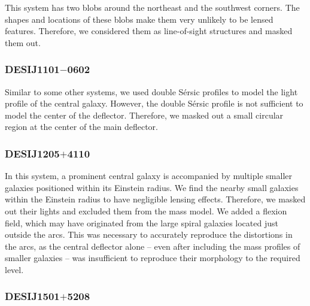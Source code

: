 \documentclass{aa}
\begin{document}
This system has two blobs around the northeast and the southwest corners. The shapes and locations of these blobs make them very unlikely to be lensed features. Therefore, we considered them as line-of-sight structures and masked them out. %

\subsubsection{DESIJ1101$-$0602}

Similar to some other systems, we used double S\'ersic profiles to model the light profile of the central galaxy. However, the double S\'ersic profile is not sufficient to model the center of the deflector. Therefore, we masked out a small circular region at the center of the main deflector.


\subsubsection{DESIJ1205$+$4110}

In this system, a prominent central galaxy is accompanied by multiple smaller galaxies positioned within its Einstein radius. We find the nearby small galaxies within the Einstein radius to have negligible lensing effects. Therefore, we masked out their lights and excluded them from the mass model. We added a flexion field, which may have originated from the large spiral galaxies located just outside the arcs. This was necessary to accurately reproduce the distortions in the arcs, as the central deflector alone -- even after including the mass profiles of smaller galaxies -- was insufficient to reproduce their morphology to the required level. %

\subsubsection{DESIJ1501$+$5208}
\end{document}
